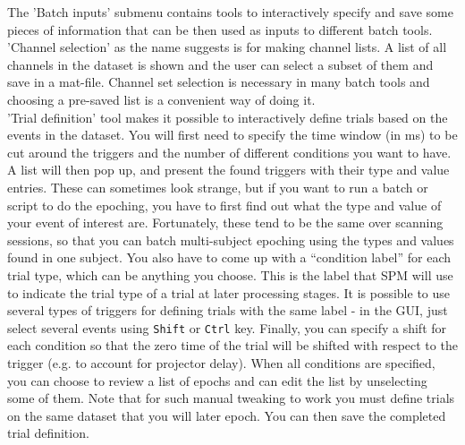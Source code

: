 The 'Batch inputs' submenu contains tools to interactively specify and save some pieces of information that can be then used as inputs to different batch tools. 
\\
'Channel selection' as the name suggests is for making channel lists. A list of all channels in the dataset is shown and the user can select a subset of them and save in a mat-file. Channel set selection is necessary in many batch tools and choosing a pre-saved list is a convenient way of doing it. 
\\
'Trial definition' tool makes it possible to interactively define trials based on the events in the dataset. You will first need to specify the time window (in ms) to be cut around the triggers and the number of different conditions you want to have.  A list will then pop up, and present the found triggers with their type and value entries. These can sometimes look strange, but if you want to run a batch or script to do the epoching, you have to first find out what the type and value of your event of interest are. Fortunately, these tend to be the same over scanning sessions, so that you can batch multi-subject epoching using the types and values found in one subject. You also have to come up with a ``condition label'' for each trial type, which can be anything you choose. This is the label that SPM will use to indicate the trial type of a trial at later processing stages. It is possible to use several types of triggers for defining trials with the same label - in the GUI, just select several events using \texttt{Shift} or \texttt{Ctrl} key. Finally, you can specify a shift for each condition so that the zero time of the trial will be shifted with respect to the trigger (e.g. to account for projector delay). When all conditions are specified, you can choose to review a list of epochs and can edit the list by unselecting some of them. Note that for such manual tweaking to work you must define trials on the same dataset that you will later epoch. You can then save the completed trial definition. 
\\
